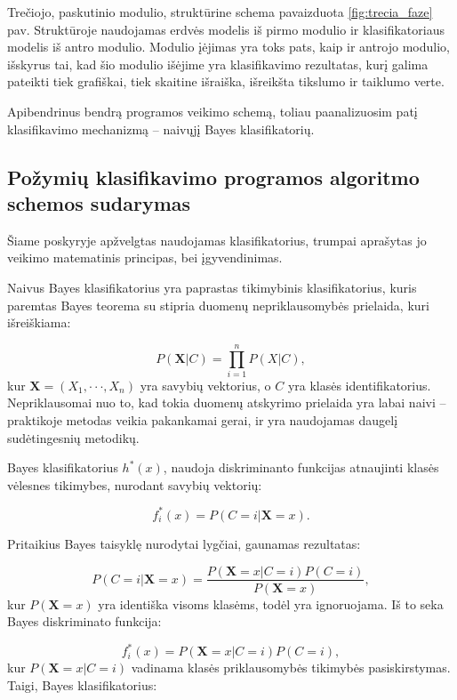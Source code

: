 \documentclass[]{vgtuef}
\begin{document}
Trečiojo, paskutinio modulio, struktūrine schema pavaizduota \ref{fig:trecia_faze} pav. Struktūroje naudojamas erdvės modelis iš pirmo modulio ir klasifikatoriaus modelis iš antro modulio. Modulio įėjimas yra toks pats, kaip ir antrojo modulio, išskyrus tai, kad šio modulio išėjime yra klasifikavimo rezultatas, kurį galima pateikti tiek grafiškai, tiek skaitine išraiška, išreikšta tikslumo ir taiklumo verte.

Apibendrinus bendrą programos veikimo schemą, toliau paanalizuosim patį klasifikavimo mechanizmą -- naivųjį Bayes klasifikatorių.

\subsection{Požymių klasifikavimo programos algoritmo schemos sudarymas}
\label{subsec:class_scheme}

Šiame poskyryje apžvelgtas naudojamas klasifikatorius, trumpai aprašytas jo veikimo matematinis principas, bei įgyvendinimas.

Naivus Bayes klasifikatorius \cite{R22230} yra paprastas tikimybinis klasifikatorius, kuris paremtas Bayes teorema su stipria duomenų nepriklausomybės prielaida, kuri išreiškiama:

\begin{equation}
	P(\mathbf{X}|C) = \prod_{i=1}^{n} P(X|C),
\end{equation}
kur $\mathbf{X} = (X_1, \cdot \cdot \cdot, X_n)$ yra savybių vektorius, o $C$ yra klasės identifikatorius. Nepriklausomai nuo to, kad tokia duomenų atskyrimo prielaida yra labai naivi -- praktikoje metodas veikia pakankamai gerai, ir yra naudojamas daugelį sudėtingesnių metodikų.

Bayes klasifikatorius $h^*(x)$, naudoja diskriminanto funkcijas atnaujinti klasės vėlesnes tikimybes, nurodant savybių vektorių:

\begin{equation}
	f^*_i(x) = P(C=i|\mathbf{X}=x).
\end{equation}

Pritaikius Bayes taisyklę nurodytai lygčiai, gaunamas rezultatas:

\begin{equation}
P(C=i|\mathbf{X}=x) = \frac{P(\mathbf{X}=x|C=i)P(C=i)}{P(\mathbf{X}=x)},
\end{equation}
kur $P(\mathbf{X}=x)$ yra identiška visoms klasėms, todėl yra ignoruojama. Iš to seka Bayes diskriminato funkcija:

\begin{equation}
	f^*_i(x) = P(\mathbf{X}=x|C=i)P(C=i),
\end{equation}
kur $P(\mathbf{X}=x|C=i)$ vadinama klasės priklausomybės tikimybės pasiskirstymas. Taigi, Bayes klasifikatorius:
\end{document}
